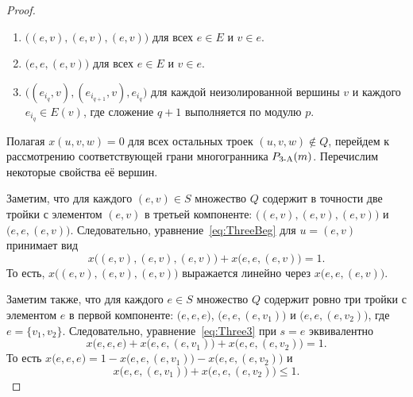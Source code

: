 \begin{proof}
\begin{enumerate}
		\item $\big( (e,v), (e,v), (e,v) \big)$ для всех $e\in E$ и $v \in e$.
		
		\item $\big( e, e, (e,v) \big)$ для всех $e\in E$ и $v \in e$.
		
		\item $\big( (e_{i_q},v), (e_{i_{q+1}},v), e_{i_q} \big)$
		для каждой неизолированной вершины $v$ и каждого $e_{i_q} \in E(v)$,
		где сложение $q+1$ выполняется по модулю $p$.
	\end{enumerate} 
	
	Полагая $x(u, v, w) = 0$ для всех остальных троек $(u, v, w)\notin Q$,
	перейдем к рассмотрению соответствующей грани многогранника $P_{\textup{3-A}}(m)$.
	Перечислим некоторые свойства её вершин.
	
	Заметим, что для каждого $(e,v) \in S$ множество $Q$ содержит в точности две тройки с элементом $(e,v)$ в третьей компоненте: $\big( (e,v), (e,v), (e,v) \big)$ и $\big( e, e, (e,v) \big)$.
	Следовательно, уравнение~\eqref{eq:ThreeBeg} для $u = (e,v)$ принимает вид
	\begin{equation}
	\label{eq:Proof3AP1}
	x\big( (e,v), (e,v), (e,v) \big) + x\big( e, e, (e,v) \big) = 1.
	\end{equation}
	То есть, $x\big( (e,v), (e,v), (e,v) \big)$ выражается линейно через $x\big( e, e, (e,v) \big)$.
	
	Заметим также, что для каждого $e \in S$ множество $Q$ содержит ровно три тройки с элементом $e$ в первой компоненте: $\big( e, e, e \big)$, $\big( e, e, (e,v_1) \big)$ и $\big( e, e, (e,v_2) \big)$, где $e = \{v_1, v_2\}$.
	Следовательно, уравнение~\eqref{eq:Three3} при $s = e$ эквивалентно
	$$
	x\big( e, e, e \big) + x\big( e, e, (e,v_1) \big) + x\big( e, e, (e,v_2) \big) = 1.
	$$
	То есть
	$x\big( e, e, e \big) = 1 - x\big( e, e, (e,v_1) \big) - x\big( e, e, (e,v_2) \big)$
	и 
	\begin{equation}
	\label{IneProof3AP}
	x\big( e, e, (e,v_1) \big) + x\big( e, e, (e,v_2) \big) \le 1.
	\end{equation}
	

\end{proof}
